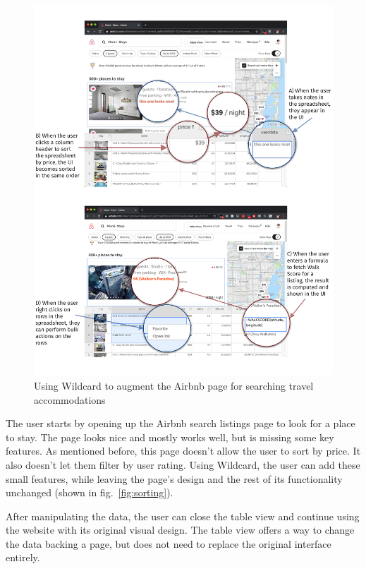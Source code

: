 \documentclass[english,submission]{programming}
\begin{document}
\begin{figure}
\hypertarget{fig:airbnb-demo}{%
\centering
\includegraphics{media/airbnb-demo-300dpi.png}
\caption{Using Wildcard to augment the Airbnb page for searching travel
accommodations}\label{fig:airbnb-demo}
}
\end{figure}

The user starts by opening up the Airbnb search listings page to look
for a place to stay. The page looks nice and mostly works well, but is
missing some key features. As mentioned before, this page doesn't allow
the user to sort by price. It also doesn't let them filter by user
rating. Using Wildcard, the user can add these small features, while
leaving the page's design and the rest of its functionality unchanged
(shown in fig.~\ref{fig:sorting}).

After manipulating the data, the user can close the table view and
continue using the website with its original visual design. The table
view offers a way to change the data backing a page, but does not need
to replace the original interface entirely.
\end{document}
